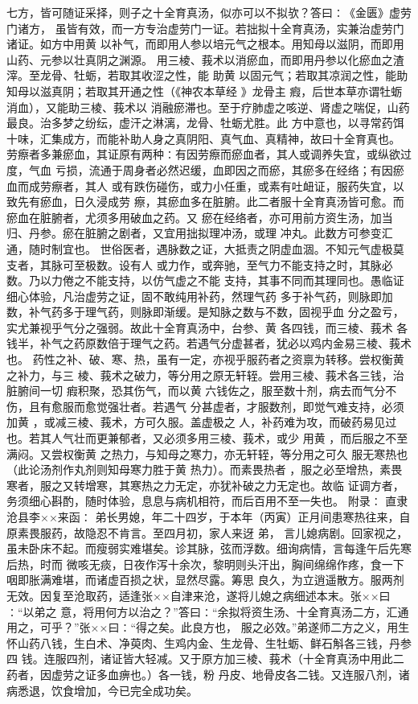 \documentclass[a4paper,12pt,UTF8,twoside]{ctexbook}
\begin{document}
七方，皆可随证采择，则子之十全育真汤，似亦可以不拟欤？答曰∶《金匮》虚劳门诸方， 
虽皆有效，而一方专治虚劳门一证。若拙拟十全育真汤，实兼治虚劳门诸证。如方中用黄 
以补气，而即用人参以培元气之根本。用知母以滋阴，而即用山药、元参以壮真阴之渊源。 
用三棱、莪术以消瘀血，而即用丹参以化瘀血之渣滓。至龙骨、牡蛎，若取其收涩之性，能 
助黄 以固元气；若取其凉润之性，能助知母以滋真阴；若取其开通之性（《神农本草经 
》龙骨主 瘕，后世本草亦谓牡蛎消血），又能助三棱、莪术以 
消融瘀滞也。至于疗肺虚之咳逆、肾虚之喘促，山药最良。治多梦之纷纭，虚汗之淋漓，龙骨、牡蛎尤胜。此 
方中意也，以寻常药饵十味，汇集成方，而能补助人身之真阴阳、真气血、真精神，故曰十全育真也。 
劳瘵者多兼瘀血，其证原有两种∶有因劳瘵而瘀血者，其人或调养失宜，或纵欲过度，气血 
亏损，流通于周身者必然迟缓，血即因之而瘀，其瘀多在经络；有因瘀血而成劳瘵者，其人 
或有跌伤碰伤，或力小任重，或素有吐衄证，服药失宜，以致先有瘀血，日久浸成劳 
瘵，其瘀血多在脏腑。此二者服十全育真汤皆可愈。而瘀血在脏腑者，尤须多用破血之药。又 
瘀在经络者，亦可用前方资生汤，加当归、丹参。瘀在脏腑之剧者，又宜用拙拟理冲汤，或理 
冲丸。此数方可参变汇通，随时制宜也。 
世俗医者，遇脉数之证，大抵责之阴虚血涸。不知元气虚极莫支者，其脉可至极数。设有人 
或力作，或奔驰，至气力不能支持之时，其脉必数。乃以力倦之不能支持，以仿气虚之不能 
支持，其事不同而其理同也。愚临证细心体验，凡治虚劳之证，固不敢纯用补药，然理气药 
多于补气药，则脉即加数，补气药多于理气药，则脉即渐缓。是知脉之数与不数，固视乎血 
分之盈亏，实尤兼视乎气分之强弱。故此十全育真汤中，台参、黄 各四钱，而三棱、莪术 
各钱半，补气之药原数倍于理气之药。若遇气分虚甚者，犹必以鸡内金易三棱、莪术也。 
药性之补、破、寒、热，虽有一定，亦视乎服药者之资禀为转移。尝权衡黄 之补力，与三 
棱、莪术之破力，等分用之原无轩轾。尝用三棱、莪术各三钱，治脏腑间一切 
瘕积聚，恐其伤气，而以黄 六钱佐之，服至数十剂，病去而气分不伤，且有愈服而愈觉强壮者。若遇气 
分甚虚者，才服数剂，即觉气难支持，必须加黄 ，或减三棱、莪术，方可久服。盖虚极之 
人，补药难为攻，而破药易见过也。若其人气壮而更兼郁者，又必须多用三棱、莪术，或少 
用黄 ，而后服之不至满闷。又尝权衡黄 之热力，与知母之寒力，亦无轩轾，等分用之可久 
服无寒热也（此论汤剂作丸剂则知母寒力胜于黄 热力）。而素畏热者 
，服之必至增热，素畏寒者，服之又转增寒，其寒热之力无定，亦犹补破之力无定也。故临 
证调方者，务须细心斟酌，随时体验，息息与病机相符，而后百用不至一失也。 
附录∶ 
直隶沧县李××来函∶ 
弟长男媳，年二十四岁，于本年（丙寅）正月间患寒热往来，自原素畏服药，故隐忍不肯言。至四月初，家人来迓 
弟， 
言儿媳病剧。回家视之，虽未卧床不起。而瘦弱实难堪矣。诊其脉，弦而浮数。细询病情，言每逢午后先寒后热，时而 
微咳无痰，日夜作泻十余次，黎明则头汗出，胸间绵绵作疼，食一下咽即胀满难堪，而诸虚百损之状，显然尽露。筹思 
良久，为立逍遥散方。服两剂无效。因复至沧取药，适逢张××自津来沧，遂将儿媳之病细述本末。张××曰∶“以弟之 
意，将用何方以治之？”答曰∶“余拟将资生汤、十全育真汤二方，汇通用之，可乎？”张××曰∶“得之矣。此良方也， 
服之必效。”弟遂师二方之义，用生怀山药八钱，生白术、净萸肉、生鸡内金、生龙骨、生牡蛎、鲜石斛各三钱，丹参四 
钱。连服四剂，诸证皆大轻减。又于原方加三棱、莪术（十全育真汤中用此二药者，因虚劳之证多血痹也。）各一钱，粉 
丹皮、地骨皮各二钱。又连服八剂，诸病悉退，饮食增加，今已完全成功矣。 
\end{document}
